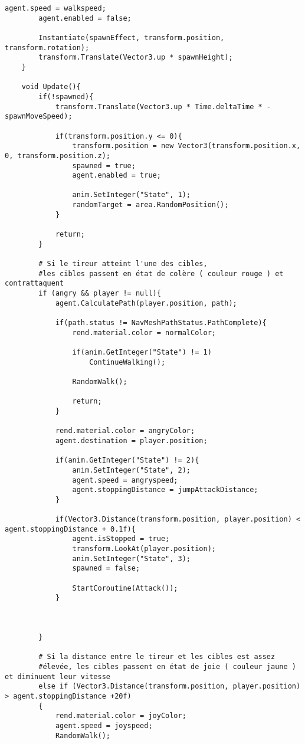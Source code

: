 \begin{lstlisting}[language=Csh]
		agent.speed = walkspeed;
		agent.enabled = false;
		
		Instantiate(spawnEffect, transform.position, transform.rotation);
		transform.Translate(Vector3.up * spawnHeight);
	}
	
	void Update(){
		if(!spawned){
			transform.Translate(Vector3.up * Time.deltaTime * -spawnMoveSpeed);
			
			if(transform.position.y <= 0){
				transform.position = new Vector3(transform.position.x, 0, transform.position.z);
				spawned = true;
				agent.enabled = true;
				
				anim.SetInteger("State", 1);
				randomTarget = area.RandomPosition();
			}
			
			return;
		}

        # Si le tireur atteint l'une des cibles,
        #les cibles passent en état de colère ( couleur rouge ) et contrattaquent  
        if (angry && player != null){
			agent.CalculatePath(player.position, path);
			
			if(path.status != NavMeshPathStatus.PathComplete){	
				rend.material.color = normalColor;
				
				if(anim.GetInteger("State") != 1)
					ContinueWalking();
				
				RandomWalk();
				
				return;
			}

            rend.material.color = angryColor;
            agent.destination = player.position;
			
			if(anim.GetInteger("State") != 2){
				anim.SetInteger("State", 2);
                agent.speed = angryspeed;
                agent.stoppingDistance = jumpAttackDistance;
			}
			
			if(Vector3.Distance(transform.position, player.position) < agent.stoppingDistance + 0.1f){
				agent.isStopped = true;
				transform.LookAt(player.position);
				anim.SetInteger("State", 3);
				spawned = false;
				
				StartCoroutine(Attack());
			}


         
        }

        # Si la distance entre le tireur et les cibles est assez  
        #élevée, les cibles passent en état de joie ( couleur jaune ) et diminuent leur vitesse
        else if (Vector3.Distance(transform.position, player.position) > agent.stoppingDistance +20f)
        {
            rend.material.color = joyColor;
            agent.speed = joyspeed;
            RandomWalk();


\end{lstlisting}
